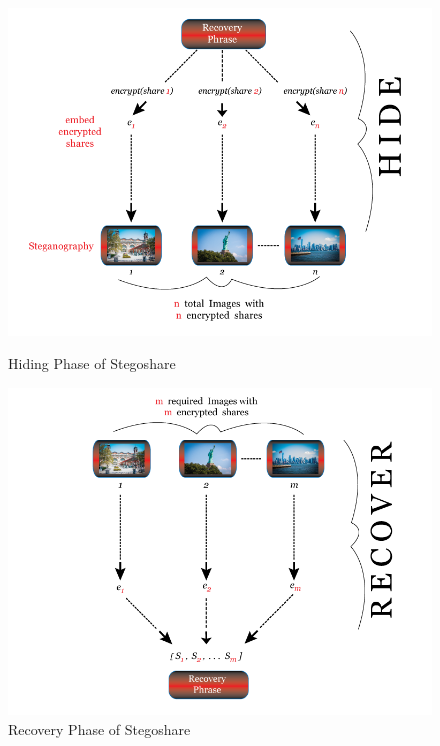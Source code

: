 \begin{figure}[H]
\centering
\begin{minipage}{.5\textwidth}
  \centering
	\includegraphics[scale = 0.29]{hide_slide-3.png}
	\caption{Hiding Phase of Stegoshare}
	\label{fig: Hiding Phas}
\end{minipage}%
\begin{minipage}{.5\textwidth}
  \centering
	\includegraphics[scale = 0.29]{recover_slide-3.png}
	\caption{Recovery Phase of Stegoshare}
	\label{fig: Recovery Phas}
\end{minipage}
\end{figure}
